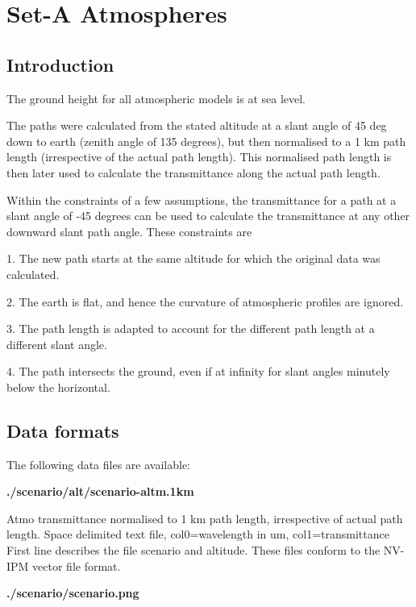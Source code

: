 \documentclass{workpackage}
\begin{document}
\chapter{Set-A Atmospheres}
\label{sec:Set-AAtmospheres}



\section{Introduction}
\label{sec:Introduction}

The ground height for all atmospheric models is at sea level.


The paths were calculated from the stated altitude at a slant angle of 45 deg down to earth (zenith angle of 135 degrees), but then normalised to a 1 km path length (irrespective of the actual path length).  This normalised path length is then later used to calculate the transmittance along the actual path length.


Within the constraints of a few assumptions, the transmittance for a path at a slant angle of -45 degrees can be used to calculate the transmittance at any other downward slant path angle.  These constraints are 


 1. The new path starts at the same altitude for which the original data was calculated.    


 2. The earth is flat, and hence the curvature of atmospheric profiles are ignored.  


 3. The path length is adapted to account for the different path length at a different slant angle.


 4. The path intersects the ground, even if at infinity for slant angles minutely below the horizontal.



\section{Data formats}
\label{sec:Dataformats}


The following data files are available:


\textbf{./scenario/alt/scenario-altm.1km} 


Atmo transmittance normalised to 1 km path length, irrespective of actual path length.
Space delimited text file, col0=wavelength in um, col1=transmittance
First line describes the file scenario and altitude. 
These files conform to the NV-IPM vector file format.


\textbf{./scenario/scenario.png}
\end{document}

